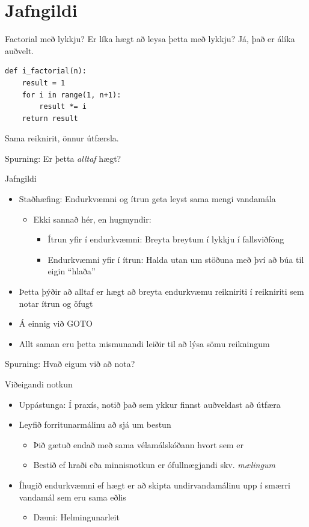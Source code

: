 \documentclass[handout]{beamer}
\begin{document}
\section{Jafngildi }

\begin{frame}[fragile]{Factorial með lykkju?}
Er líka hægt að leysa þetta með lykkju?
\pause
Já, það er álíka auðvelt.
\begin{verbatim}
def i_factorial(n):
    result = 1
    for i in range(1, n+1):
        result *= i
    return result
\end{verbatim}
Sama reiknirit, önnur útfærsla.

\pause
Spurning: Er þetta \emph{alltaf} hægt?
\end{frame}

\begin{frame}{Jafngildi}
\begin{itemize}
 \item Staðhæfing: Endurkvæmni og ítrun geta leyst sama mengi vandamála
 \begin{itemize}
  \item Ekki sannað hér, en hugmyndir:
  \begin{itemize}
   \item Ítrun yfir í endurkvæmni: Breyta breytum í lykkju í fallsviðföng
   \item Endurkvæmni yfir í ítrun: Halda utan um stöðuna með því að búa til eigin ``hlaða''
  \end{itemize}
 \end{itemize}
 \item Þetta þýðir að alltaf er hægt að breyta endurkvæmu reikniriti í reikniriti sem notar ítrun og öfugt
 \item Á einnig við GOTO
 \item Allt saman eru þetta mismunandi leiðir til að lýsa sömu reikningum
\end{itemize}
\pause
Spurning: Hvað eigum við að nota?
\end{frame}

\begin{frame}{Viðeigandi notkun}
\begin{itemize}
 \item Uppástunga: Í praxís, notið það sem ykkur finnst auðveldast að útfæra
 \item Leyfið forritunarmálinu að sjá um bestun
 \begin{itemize}
  \item Þið gætuð endað með sama vélamálskóðann hvort sem er
  \item Bestið ef hraði eða minnisnotkun er ófullnægjandi skv. \emph{mælingum}
 \end{itemize}
 \item Íhugið endurkvæmni ef hægt er að skipta undirvandamálinu upp í smærri vandamál sem eru sama eðlis
 \begin{itemize}
  \item Dæmi: Helmingunarleit
 \end{itemize}
\end{itemize}
\end{frame}
\end{document}
